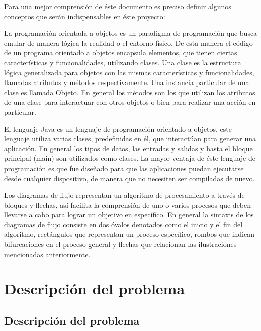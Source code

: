 \documentclass[letterpaper,12pt]{report}
\begin{document}
Para una mejor comprensión de éste documento es preciso definir algunos conceptos que
serán indispensables en éste proyecto:

\begin{description}[align=left]
\item [Programaci\'on orientada a objetos:] 
	La programación orientada a objetos es un paradigma de programación que busca emular
	de manera lógica la realidad o el entorno físico. De esta manera el código de un programa
	orientado a objetos encapsula elementos, que tienen ciertas características y
	funcionalidades, utilizando clases. Una clase es la estructura lógica generalizada para
	objetos con las mismas características y funcionalidades, llamadas atributos y métodos
	respectivamente. Una instancia particular de una clase es llamada Objeto. En general los
	métodos son los que utilizan los atributos de una clase para interactuar con otros objetos o
	bien para realizar una acción en particular.

\item [Lenguaje de programaci\'on Java:]
	El lenguaje Java es un lenguaje de programación orientado a objetos, este lenguaje utiliza
	varias clases, predefinidas en él, que interactúan para generar una aplicación. En general
	los tipos de datos, las entradas y salidas y hasta el bloque principal (main) son utilizados
	como clases. La mayor ventaja de éste lenguaje de programación es que fue diseñado para
	que las aplicaciones puedan ejecutarse desde cualquier dispositivo, de manera que no
	necesiten ser compiladas de nuevo.

\item [Diagramas de flujo:]
	Los diagramas de flujo representan un algoritmo de procesamiento a través de bloques y
	flechas, así facilita la comprensión de uno o varios procesos que deben llevarse a cabo para
	lograr un objetivo en específico. En general la sintaxis de los diagramas de flujo consiste en
	dos óvalos denotados como el inicio y el fin del algoritmo, rectángulos que representan un
	proceso específico, rombos que indican bifurcaciones en el proceso general y flechas que
	relacionan las ilustraciones mencionadas anteriormente.
\end{description}

\chapter{Descripci\'on del problema}

\section {Descripci\'on del problema}
\end{document}
